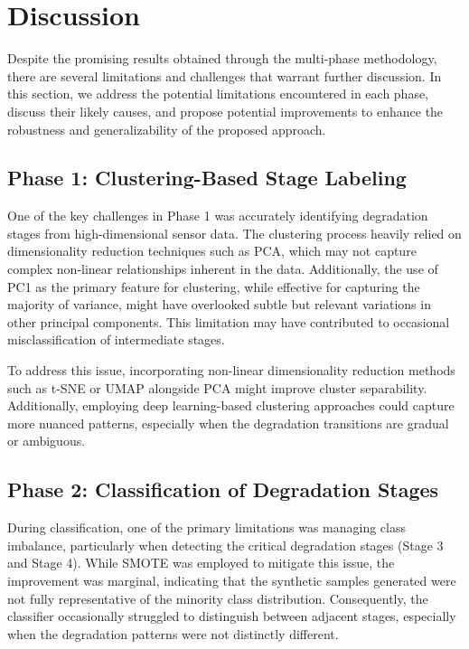 \documentclass[conference]{IEEEtran}
\begin{document}
\section{Discussion}

Despite the promising results obtained through the multi-phase methodology, there are several limitations and challenges that warrant further discussion. In this section, we address the potential limitations encountered in each phase, discuss their likely causes, and propose potential improvements to enhance the robustness and generalizability of the proposed approach.

\subsection{Phase 1: Clustering-Based Stage Labeling}

One of the key challenges in Phase 1 was accurately identifying degradation stages from high-dimensional sensor data. The clustering process heavily relied on dimensionality reduction techniques such as PCA, which may not capture complex non-linear relationships inherent in the data. Additionally, the use of PC1 as the primary feature for clustering, while effective for capturing the majority of variance, might have overlooked subtle but relevant variations in other principal components. This limitation may have contributed to occasional misclassification of intermediate stages.

To address this issue, incorporating non-linear dimensionality reduction methods such as t-SNE or UMAP alongside PCA might improve cluster separability. Additionally, employing deep learning-based clustering approaches could capture more nuanced patterns, especially when the degradation transitions are gradual or ambiguous.

\subsection{Phase 2: Classification of Degradation Stages}

During classification, one of the primary limitations was managing class imbalance, particularly when detecting the critical degradation stages (Stage 3 and Stage 4). While SMOTE was employed to mitigate this issue, the improvement was marginal, indicating that the synthetic samples generated were not fully representative of the minority class distribution. Consequently, the classifier occasionally struggled to distinguish between adjacent stages, especially when the degradation patterns were not distinctly different.
\end{document}

